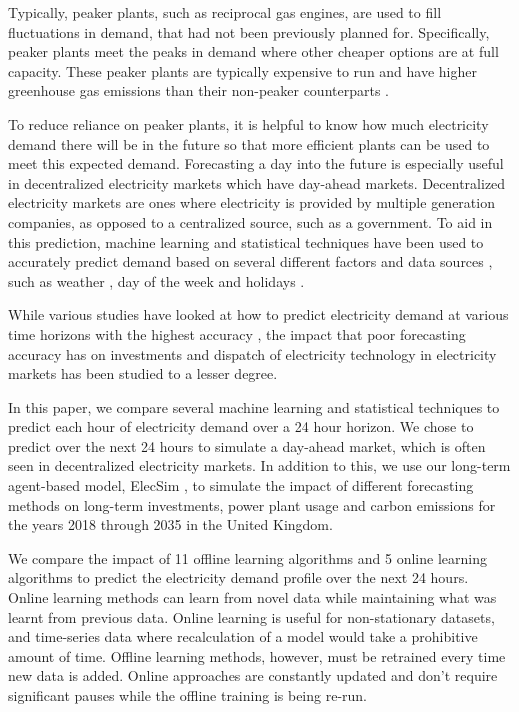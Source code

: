 \documentclass[final,3p,times,twocolumn,numbers]{elsarticle}
\begin{document}
Typically, peaker plants, such as reciprocal gas engines, are used to fill fluctuations in demand, that had not been previously planned for. Specifically, peaker plants meet the peaks in demand where other cheaper options are at full capacity. These peaker plants are typically expensive to run and have higher greenhouse gas emissions than their non-peaker counterparts \cite{Mahmood2014}. 

To reduce reliance on peaker plants, it is helpful to know how much electricity demand there will be in the future so that more efficient plants can be used to meet this expected demand. Forecasting a day into the future is especially useful in decentralized electricity markets which have day-ahead markets. Decentralized electricity markets are ones where electricity is provided by multiple generation companies, as opposed to a centralized source, such as a government. To aid in this prediction, machine learning and statistical techniques have been used to accurately predict demand based on several different factors and data sources \cite{Kell2018a}, such as weather \cite{Hong2014}, day of the week \cite{Al-Musaylh2018} and holidays \cite{Vrablecova2017}. 



While various studies have looked at how to predict electricity demand at various time horizons with the highest accuracy \cite{Singh2012,Huang2003,Andersen2013}, the impact that poor forecasting accuracy has on investments and dispatch of electricity technology in electricity markets has been studied to a lesser degree.

In this paper, we compare several machine learning and statistical techniques to predict each hour of electricity demand over a 24 hour horizon. We chose to predict over the next 24 hours to simulate a day-ahead market, which is often seen in decentralized electricity markets. In addition to this, we use our long-term agent-based model, ElecSim \cite{Kell, Kell2020}, to simulate the impact of different forecasting methods on long-term investments, power plant usage and carbon emissions for the years 2018 through 2035 in the United Kingdom. 



We compare the impact of 11 offline learning algorithms and 5 online learning algorithms to predict the electricity demand profile over the next 24 hours. Online learning methods can learn from novel data while maintaining what was learnt from previous data. Online learning is useful for non-stationary datasets, and time-series data where recalculation of a model would take a prohibitive amount of time. Offline learning methods, however, must be retrained every time new data is added. Online approaches are constantly updated and don’t require significant pauses while the offline training is being re-run. %
\end{document}
